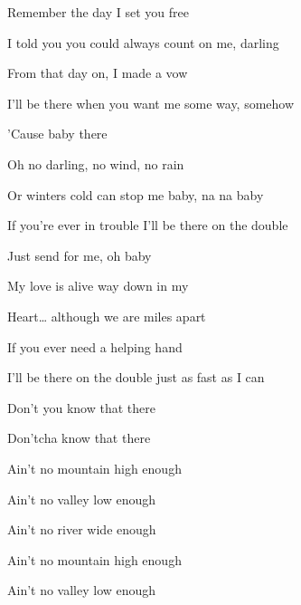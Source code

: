 \begin{song}
\bigskip

Remember the day I set you free \par
I told you you could always count on me, darling \par
From that day on, I made a vow \par
I'll be there when you want me some way, somehow \par
'Cause baby there \par

\bigskip

\Chorus

\bigskip

 Oh no darling, no wind, no rain \par
Or winters cold  can stop me baby, na na baby \par
If you're ever in trouble I'll be there on the double \par
Just send for me, oh baby \par

\bigskip

 My love is alive way down in my \par
{}Heart… although we are miles apart \par
If you ever need a helping hand \par
I'll be there on the double just as fast as I can \par
Don't you know that there \par

\bigskip

\Chorus

\bigskip

Don'tcha know that there \par

\bigskip

 \par
{}Ain't no mountain high  enough  \par
{}Ain't no valley low  enough  \par
{}Ain't no river wide  enough  \par
{}Ain't no mountain high  enough  \par
{}Ain't no valley low  enough  \par


\end{song}
